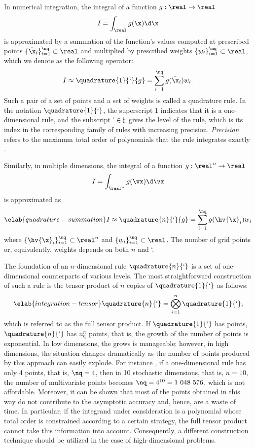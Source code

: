 In numerical integration, the integral of a function $g: \real \to \real$
\[
  I = \int_\real g(\x) \d \x
\]
is approximated by a summation of the function's values computed at prescribed
points $\{ \hat{\x}_i \}_{i = 1}^\nq \subset \real$ and multiplied by prescribed
weights $\{ w_i \}_{i = 1}^\nq \subset \real$, which we denote as the following
operator:
\[
  I \approx \quadrature{1}{\lq}{g} = \sum_{i = 1}^\nq g(\hat{\x}_i) w_i.
\]
Such a pair of a set of points and a set of weights is called a quadrature rule.
In the notation $\quadrature{1}{\lq}$, the superscript $1$ indicates that it is
a one-dimensional rule, and the subscript $\lq \in \natural$ gives the level of
the rule, which is its index in the corresponding family of rules with
increasing precision. \emph{Precision} refers to the maximum total order of
polynomials that the rule integrates exactly \cite{heiss2008}.

Similarly, in multiple dimensions, the integral of a function $g: \real^n \to
\real$
\[
  I = \int_{\real^n} g(\vx) \d \vx
\]
is approximated as
\begin{equation} \elab{quadrature-summation}
  I \approx \quadrature{n}{\lq}{g} = \sum_{i = 1}^\nq g(\hv{\x}_i) w_i
\end{equation}
where $\{ \hv{\x}_i \}_{i = 1}^\nq \subset \real^n$ and $\{ w_i \}_{i = 1}^\nq
\subset \real$. The number of grid points or, equivalently, weights \nq depends
on both $n$ and \lq.

The foundation of an $n$-dimensional rule $\quadrature{n}{\lq}$ is a set of
one-dimensional counterparts of various levels. The most straightforward
construction of such a rule is the tensor product of $n$ copies of
$\quadrature{1}{\lq}$ as follows:
\begin{equation} \elab{integration-tensor}
  \quadrature{n}{\lq} = \bigotimes_{i = 1}^n \quadrature{1}{\lq},
\end{equation}
which is referred to as the full tensor product. If $\quadrature{1}{\lq}$ has
\nq points, $\quadrature{n}{\lq}$ has $n_\mathrm{q}^n$ points, that is, the
growth of the number of points is exponential. In low dimensions, the grows is
manageable; however, in high dimensions, the situation changes dramatically as
the number of points produced by this approach can easily explode. For instance
\cite{heiss2008}, if a one-dimensional rule has only 4 points, that is, $\nq =
4$, then in 10 stochastic dimensions, that is, $n = 10$, the number of
multivariate points becomes $\nq = 4^{10} = 1~048~576$, which is not affordable.
Moreover, it can be shown that most of the points obtained in this way do not
contribute to the asymptotic accuracy and, hence, are a waste of time. In
particular, if the integrand under consideration is a polynomial whose total
order is constrained according to a certain strategy, the full tensor product
cannot take this information into account. Consequently, a different
construction technique should be utilized in the case of high-dimensional
problems.

